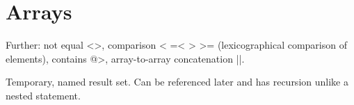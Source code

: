 
\section{Arrays}

\begin{breakbox}

\end{breakbox}

\begin{breakbox}
\end{breakbox}

\begin{breakbox}
\end{breakbox}

\begin{breakbox}
\end{breakbox}

\begin{breakbox}
\end{breakbox}

\begin{breakbox}

Further: not equal <>, comparison < =< > >= (lexicographical comparison of elements), contains @>, array-to-array concatenation ||.
\end{breakbox}

\begin{breakbox}

Temporary, named result set. Can be referenced later and has recursion unlike a nested statement.


\end{breakbox}